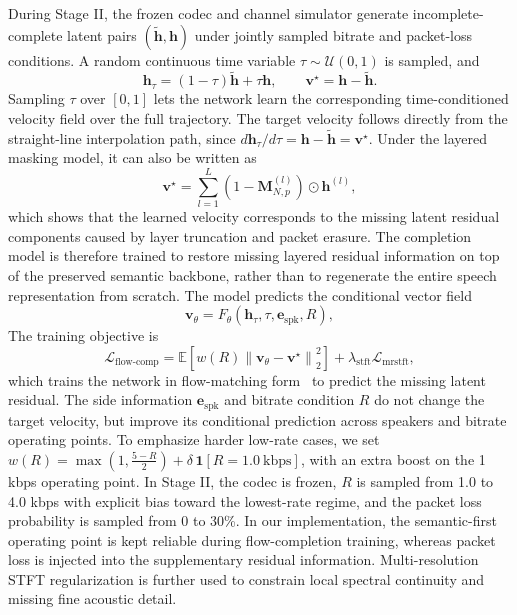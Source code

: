 \documentclass[conference]{IEEEtran}
\begin{document}
During Stage II, the frozen codec and channel simulator generate incomplete-complete latent pairs $(\widetilde{\mathbf{h}},\mathbf{h})$ under jointly sampled bitrate and packet-loss conditions. A random continuous time variable $\tau\sim\mathcal{U}(0,1)$ is sampled, and
\begin{equation}
\mathbf{h}_{\tau}=(1-\tau)\widetilde{\mathbf{h}}+\tau\mathbf{h},
\qquad
\mathbf{v}^{\star}=\mathbf{h}-\widetilde{\mathbf{h}}.
\end{equation}
Sampling $\tau$ over $[0,1]$ lets the network learn the corresponding time-conditioned velocity field over the full trajectory. The target velocity follows directly from the straight-line interpolation path, since $d\mathbf{h}_{\tau}/d\tau=\mathbf{h}-\widetilde{\mathbf{h}}=\mathbf{v}^{\star}$. Under the layered masking model, it can also be written as
\begin{equation}
\mathbf{v}^{\star}=
\sum_{l=1}^{L}\left(1-\mathbf{M}^{(l)}_{N,p}\right)\odot \mathbf{h}^{(l)},
\end{equation}
which shows that the learned velocity corresponds to the missing latent residual components caused by layer truncation and packet erasure. The completion model is therefore trained to restore missing layered residual information on top of the preserved semantic backbone, rather than to regenerate the entire speech representation from scratch. The model predicts the conditional vector field
\begin{equation}
\mathbf{v}_{\theta}=F_{\theta}(\mathbf{h}_{\tau},\tau,\mathbf{e}_{\mathrm{spk}},R),
\end{equation}
The training objective is
\begin{equation}
\mathcal{L}_{\mathrm{flow\text{-}comp}}=\mathbb{E}\!\left[w(R)\left\|\mathbf{v}_{\theta}-\mathbf{v}^{\star}\right\|_2^2\right]+\lambda_{\mathrm{stft}}\mathcal{L}_{\mathrm{mrstft}},
\end{equation}
which trains the network in flow-matching form~\cite{lipman2023flow} to predict the missing latent residual. The side information $\mathbf{e}_{\mathrm{spk}}$ and bitrate condition $R$ do not change the target velocity, but improve its conditional prediction across speakers and bitrate operating points. To emphasize harder low-rate cases, we set $w(R)=\max\!\left(1,\frac{5-R}{2}\right)+\delta\,\mathbf{1}[R=1.0\ \mathrm{kbps}]$, with an extra boost on the 1 kbps operating point. In Stage II, the codec is frozen, $R$ is sampled from 1.0 to 4.0 kbps with explicit bias toward the lowest-rate regime, and the packet loss probability is sampled from 0 to 30\%. In our implementation, the semantic-first operating point is kept reliable during flow-completion training, whereas packet loss is injected into the supplementary residual information. Multi-resolution STFT regularization is further used to constrain local spectral continuity and missing fine acoustic detail.
\end{document}
